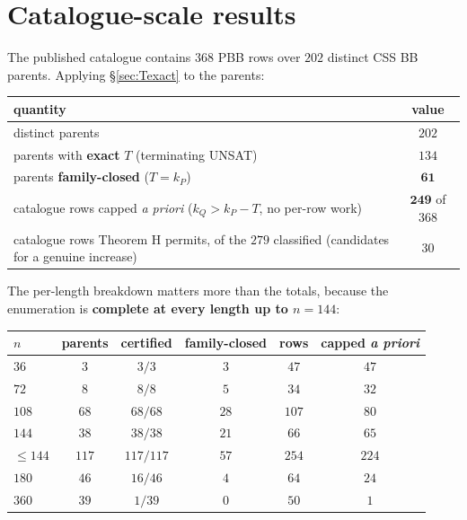 \documentclass[11pt]{article}
\theoremstyle{plain}
\theoremstyle{remark}
\begin{document}
\section{Catalogue-scale results}\label{sec:catalogue}

The published catalogue \cite{cruzbenito2026evolutionary} contains $368$ PBB rows over $202$ distinct
CSS BB parents. Applying \S\ref{sec:Texact} to the parents:

\begin{table}[ht]
\centering
\begin{tabular}{lc}
\toprule
quantity & value \\
\midrule
distinct parents & $202$ \\
parents with \textbf{exact} $T$ (terminating UNSAT) & $134$ \\
parents \textbf{family-closed} ($T=k_P$) & $\mathbf{61}$ \\
catalogue rows capped \emph{a priori} ($k_Q>k_P-T$, no per-row work) & $\mathbf{249}$ of $368$ \\
catalogue rows Theorem H permits, of the $279$ classified (candidates for a genuine increase) & $30$ \\
\bottomrule
\end{tabular}
\end{table}

The per-length breakdown matters more than the totals, because the enumeration is
\textbf{complete at every length up to $n=144$}:

\begin{table}[ht]
\centering
\begin{tabular}{lccccc}
\toprule
$n$ & parents & certified & family-closed & rows & capped \emph{a priori} \\
\midrule
$36$ & $3$ & $3/3$ & $3$ & $47$ & $47$ \\
$72$ & $8$ & $8/8$ & $5$ & $34$ & $32$ \\
$108$ & $68$ & $68/68$ & $28$ & $107$ & $80$ \\
$144$ & $38$ & $38/38$ & $21$ & $66$ & $65$ \\
\textbf{$\le 144$} & \textbf{$117$} & \textbf{$117/117$} & \textbf{$57$} & \textbf{$254$} & \textbf{$224$} \\
$180$ & $46$ & $16/46$ & $4$ & $64$ & $24$ \\
$360$ & $39$ & $1/39$ & $0$ & $50$ & $1$ \\
\bottomrule
\end{tabular}
\end{table}
\end{document}
